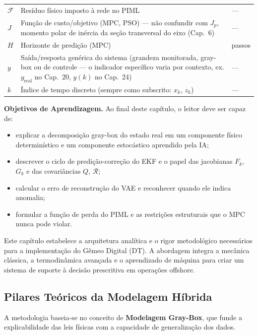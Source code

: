 \documentclass[12pt,a4paper]{article}
\numberwithin{equation}{section}
\numberwithin{table}{section}
\numberwithin{figure}{section}
\begin{document}
{{\begin{longtable}{>{\raggedright\arraybackslash}p{2.6cm} >{\raggedright\arraybackslash}p{9.2cm} >{\raggedright\arraybackslash}p{2.6cm}}
	$\mathcal{F}$ & Resíduo físico imposto à rede no PIML & --- \\
	$J$ & Função de custo/objetivo (MPC, PSO) — não confundir com $J_p$, momento polar de inércia da seção transversal do eixo (Cap.~6) & --- \\
	$H$ & Horizonte de predição (MPC) & passos \\
	$y$ & Saída/resposta genérica do sistema (grandeza monitorada, gray-box ou de controle — o indicador específico varia por contexto, ex. $y_{\text{real}}$ no Cap.~20, $y(k)$ no Cap.~24) & --- \\
	$k$ & Índice de tempo discreto (sempre como subscrito: $x_k$, $z_k$) & --- \\
	\bottomrule
\end{longtable}
}

	\textbf{Objetivos de Aprendizagem.} Ao final deste capítulo, o leitor
	deve ser capaz de:
	\begin{itemize}
		\item explicar a decomposição gray-box do estado real em um
		componente físico determinístico e um componente estocástico
		aprendido pela IA;
		\item descrever o ciclo de predição-correção do EKF e o papel das
		jacobianas $F_k$, $G_k$ e das covariâncias $Q$, $\mathcal{R}$;
		\item calcular o erro de reconstrução do VAE e reconhecer quando
		ele indica anomalia;
		\item formular a função de perda do PIML e as restrições
		estruturais que o MPC nunca pode violar.
	\end{itemize}

	Este capítulo estabelece a arquitetura analítica e o rigor metodológico necessários para a implementação do Gêmeo Digital (DT). A abordagem integra a mecânica clássica, a termodinâmica avançada e o aprendizado de máquina para criar um sistema de suporte à decisão prescritiva em operações offshore.
	
	\subsection{Pilares Teóricos da Modelagem Híbrida}
	
	A metodologia baseia-se no conceito de \textbf{Modelagem Gray-Box}, que funde a explicabilidade das leis físicas com a capacidade de generalização dos dados.
	
}
\end{document}

